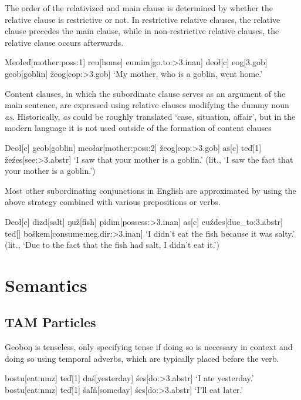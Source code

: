 \documentclass[a4paper,11pt,oneside,openany]{memoir}
\newcommand{\vd}{ď}
\newcommand{\vz}{ž}
\newcommand{\vs}{š}
\newcommand{\vl}{ľ}
\newcommand{\vn}{ň}
\newcommand{\engma}{ŋ}
\begin{document}
The order of the relativized and main clause is determined by whether the relative clause is restrictive or not. In restrictive relative clauses, the relative clause precedes the main clause, while in non-restrictive relative clauses, the relative clause occurs afterwards.

\ex
\begingl
Meo\l e\vd[mother:{\sc poss:1}]
reu[home]
eumim[go.to:{\sc >3.inan}]
\nogloss{,}
deo{\l}[{\sc c}]
eog[{\sc 3.gob}]
geob[goblin]
\vz eog[\sc cop:>3.gob]
\glft `My mother, who is a goblin, went home.'
\endgl
\xe

Content clauses, in which the subordinate clause serves as an argument of the main sentence, are expressed using relative clauses modifying the dummy noun \textit{as}. Historically, \textit{as} could be roughly translated `case, situation, affair', but in the modern language it is not used outside of the formation of content clauses

\ex
\begingl
Deo{\l}[{\sc c}] 
geob[goblin]
meo\l ar[mother:{\sc poss:2}]
\vz eog[\sc cop:>3.gob]
\nogloss{,}
as[{\sc c}]
te{\vd}[1]
\vz e\'zes[see:{\sc >3.abstr}]
\glft `I saw that your mother is a goblin.' (lit., `I saw the fact that your mother is a goblin.')
\endgl
\xe

Most other subordinating conjunctions in English are approximated by using the above strategy combined with various prepositions or verbs.

\ex 
\begingl
Deo\l[\sc c]
dizd[salt]
\engma u\vz[fish]
pidim[possess:{\sc >3.inan}]
\nogloss{,}
as[\sc c]
euźdes[due\_to:{\sc 3.abstr}]
te\vd[] 
bo\vs kem[consume:{\sc neg.dir:>3.inan}]
\glft `I didn't eat the fish because it was salty.' (lit., `Due to the fact that the fish had salt, I didn't eat it.')
\endgl
\xe 

\chapter{Semantics}

\section{TAM Particles}

Geobo{\engma} is tenseless, only specifying tense if doing so is necessary in context and doing so using temporal adverbs, which are typically placed before the verb.

\pex 
\a 
\begingl 
bostu[eat:{\sc nmz}]
te\vd[1]
da\'s[yesterday]
\'ses[do:{\sc >3.abstr}]
\glft `I ate yesterday.'
\endgl
\a 
\begingl 
bostu[eat:{\sc nmz}]
te\vd[1]
\vs a\vl\vn[someday]
\'ses[do:{\sc >3.abstr}]
\glft `I'll eat later.'
\endgl 
\xe
\end{document}
